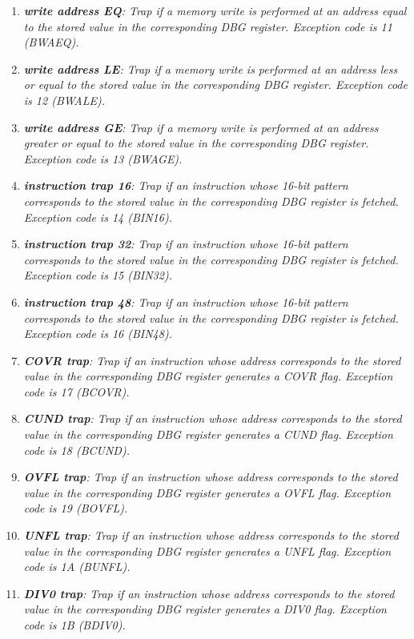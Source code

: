 \documentclass{article}
\begin{document}
\begin{enumerate}
                    \item \textit{\textbf{write address EQ}: Trap if a memory write is performed at an address equal to the stored value in the corresponding DBG register. Exception code is 11 (BWAEQ).}

                    \item \textit{\textbf{write address LE}: Trap if a memory write is performed at an address less or equal to the stored value in the corresponding DBG register. Exception code is 12 (BWALE).}

                    \item \textit{\textbf{write address GE}: Trap if a memory write is performed at an address greater or equal to the stored value in the corresponding DBG register. Exception code is 13 (BWAGE).}

                    \item \textit{\textbf{instruction trap 16}: Trap if an instruction whose 16-bit pattern corresponds to the stored value in the corresponding DBG register is fetched. Exception code is 14 (BIN16).}

                    \item \textit{\textbf{instruction trap 32}: Trap if an instruction whose 16-bit pattern corresponds to the stored value in the corresponding DBG register is fetched. Exception code is 15 (BIN32).}

                    \item \textit{\textbf{instruction trap 48}: Trap if an instruction whose 16-bit pattern corresponds to the stored value in the corresponding DBG register is fetched. Exception code is 16 (BIN48).}

                    \item \textit{\textbf{COVR trap}: Trap if an instruction whose address corresponds to the stored value in the corresponding DBG register generates a COVR flag. Exception code is 17 (BCOVR).}

                    \item \textit{\textbf{CUND trap}: Trap if an instruction whose address corresponds to the stored value in the corresponding DBG register generates a CUND flag. Exception code is 18 (BCUND).}

                    \item \textit{\textbf{OVFL trap}: Trap if an instruction whose address corresponds to the stored value in the corresponding DBG register generates a OVFL flag. Exception code is 19 (BOVFL).}

                    \item \textit{\textbf{UNFL trap}: Trap if an instruction whose address corresponds to the stored value in the corresponding DBG register generates a UNFL flag. Exception code is 1A (BUNFL).}

                    \item \textit{\textbf{DIV0 trap}: Trap if an instruction whose address corresponds to the stored value in the corresponding DBG register generates a DIV0 flag. Exception code is 1B (BDIV0).}

                \end{enumerate}
\end{document}
